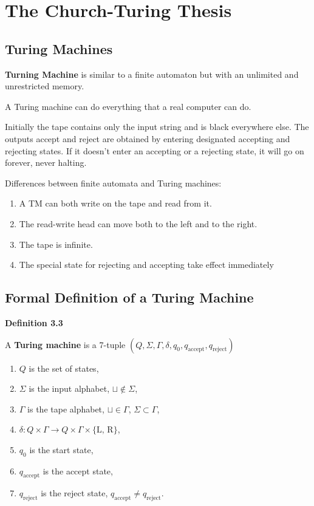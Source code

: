 \section{The Church-Turing Thesis}

\subsection{Turing Machines}

\textbf{Turning Machine} is similar to a finite automaton but with an unlimited and unrestricted memory.

A Turing machine can do everything that a real computer can do.

Initially the tape contains only the input string and is black everywhere else. The outputs accept and reject are obtained by entering designated accepting and rejecting states. If it doesn't enter an accepting or a rejecting state, it will go on forever, never halting.

Differences between finite automata and Turing machines:
\begin{enumerate}
\item A TM can both write on the tape and read from it.
\item The read-write head can move both to the left and to the right.
\item The tape is infinite.
\item The special state for rejecting and accepting take effect immediately
\end{enumerate}

\subsection{Formal Definition of a Turing Machine}

\begin{shaded}
\textbf{Definition 3.3}

\medskip
A \textbf{Turing machine} is a 7-tuple $(Q, \Sigma, \Gamma, \delta, q_0, q_\text{accept}, q_\text{reject})$

\begin{enumerate}
\item $Q$ is the set of states,
\item $\Sigma$ is the input alphabet, $\sqcup \not \in \Sigma$,
\item $\Gamma$ is the tape alphabet, $\sqcup \in \Gamma$, $\Sigma \subset \Gamma$,
\item $\delta: Q \times \Gamma \rightarrow Q \times \Gamma \times \{\text{L, R}\}$,
\item $q_0$ is the start state,
\item $q_\text{accept}$ is the accept state,
\item $q_\text{reject}$ is the reject state, $q_\text{accept} \neq q_\text{reject}$.
\end{enumerate}
\end{shaded}

